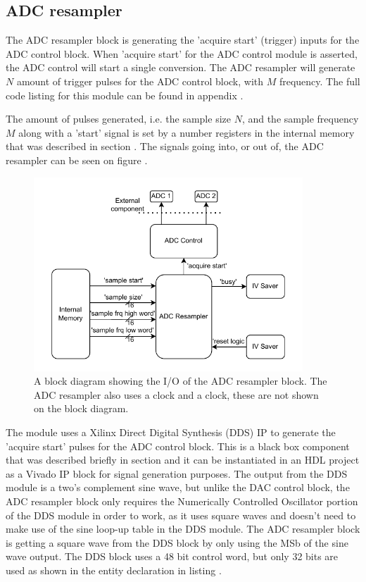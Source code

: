 \subsection{ADC resampler} \label{subsec:ADCResampler}
The ADC resampler block is generating the 'acquire start' (trigger) inputs for the ADC control block. When 'acquire start' for the ADC control module is asserted, the ADC control will start a single conversion. The ADC resampler will generate $N$ amount of trigger pulses for the ADC control block, with $M$ frequency. The full code listing for this module can be found in appendix .

The amount of pulses generated, i.e. the sample size $N$, and the sample frequency $M$ along with a 'start' signal is set by a number registers in the internal memory that was described in section . The signals going into, or out of, the ADC resampler can be seen on figure .

\begin{figure}[H]
    \centering
    \includegraphics[clip, trim=0 0 0 0, width=0.9\textwidth]{Sections/7_SystemDesign/Figures/7_2_10_Resample_IO.pdf}
    \caption{A block diagram showing the I/O of the ADC resampler block. The ADC resampler also uses a  clock and a  clock, these are not shown on the block diagram.}
    \label{fig:7_2_10_RESAMPLE_IO}
\end{figure}

The module uses a Xilinx Direct Digital Synthesis (DDS) IP\cite{XILINXDDS} to generate the 'acquire start' pulses for the ADC control block. This is a black box component that was described briefly in section  and it can be instantiated in an HDL project as a Vivado IP block for signal generation purposes. The output from the DDS module is a two's complement sine wave, but unlike the DAC control block, the ADC resampler block only requires the Numerically Controlled Oscillator portion of the DDS module in order to work, as it uses square waves and doesn't need to make use of the sine loop-up table in the DDS module. The ADC resampler block is getting a square wave from the DDS block by only using the MSb of the sine wave output. The DDS block uses a 48 bit control word, but only 32 bits are used as shown in the entity declaration in listing .

